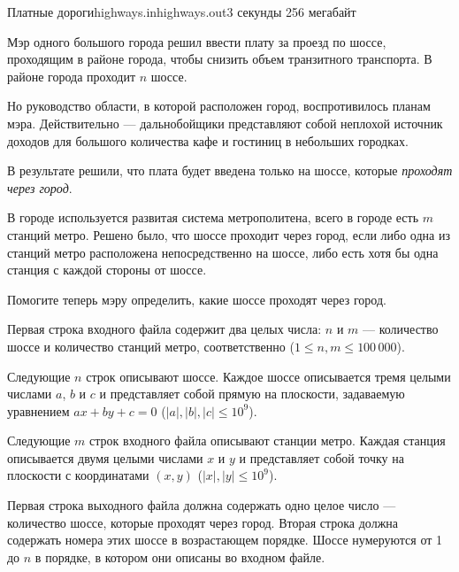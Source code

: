 \begin{problem}{Платные дороги}{highways.in}{highways.out}{3 секунды}
{256 мегабайт}

Мэр одного большого города решил ввести плату за проезд по шоссе, проходящим
в районе города, чтобы снизить объем транзитного транспорта. В районе города
проходит $n$ шоссе.

Но руководство области, в которой расположен город, воспротивилось планам
мэра. Действительно --- дальнобойщики представляют собой неплохой источник
доходов для большого количества кафе и гостиниц в небольших городках.

В результате решили, что плата будет введена только на шоссе, которые 
\emph{проходят через город}. 

В городе используется развитая система метрополитена, всего в городе есть $m$ 
станций метро. Решено было, что шоссе проходит через город, если либо
одна из станций метро расположена непосредственно на шоссе, либо есть хотя бы одна
станция с каждой стороны от шоссе.

Помогите теперь мэру определить, какие шоссе проходят через город.


\InputFile
Первая строка входного файла содержит два целых числа: $n$ и $m$ ---
количество шоссе и количество станций метро, соответственно
($1 \le n, m \le 100\,000$). 

Следующие $n$ строк описывают шоссе. Каждое шоссе описывается
тремя целыми числами $a$, $b$ и $c$ и представляет собой прямую на
плоскости, задаваемую уравнением $ax+by+c=0$
($|a|,|b|,|c| \le 10^9$). 

Следующие $m$ строк входного файла описывают станции метро. Каждая станция
описывается двумя целыми числами $x$ и $y$ и представляет собой точку
на плоскости с координатами $(x, y)$ ($|x|, |y| \le 10^9$).


\OutputFile
Первая строка выходного файла должна содержать одно целое число --- количество
шоссе, которые проходят через город. Вторая строка должна содержать номера этих шоссе
в возрастающем порядке. Шоссе нумеруются от 1 до $n$ в порядке, в котором
они описаны во входном файле.


\Examples

\begin{example}
%
\end{example}

\end{problem}


